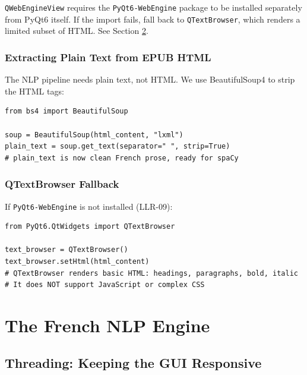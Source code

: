 \documentclass[12pt,oneside]{book}
\begin{document}
\begin{warnbox}
\texttt{QWebEngineView} requires the \texttt{PyQt6-WebEngine} package to be installed
separately from PyQt6 itself. If the import fails, fall back to \texttt{QTextBrowser},
which renders a limited subset of HTML. See Section \ref{sec:textbrowser-fallback}.
\end{warnbox}

\section{Extracting Plain Text from EPUB HTML}
\label{sec:epub-text}

The NLP pipeline needs plain text, not HTML. We use BeautifulSoup4 to strip the HTML tags:

\begin{lstlisting}[caption={Stripping HTML tags for NLP input}]
from bs4 import BeautifulSoup

soup = BeautifulSoup(html_content, "lxml")
plain_text = soup.get_text(separator=" ", strip=True)
# plain_text is now clean French prose, ready for spaCy
\end{lstlisting}

\section{QTextBrowser Fallback}
\label{sec:textbrowser-fallback}

If \texttt{PyQt6-WebEngine} is not installed (LLR-09):

\begin{lstlisting}[caption={QTextBrowser fallback for EPUB rendering}]
from PyQt6.QtWidgets import QTextBrowser

text_browser = QTextBrowser()
text_browser.setHtml(html_content)
# QTextBrowser renders basic HTML: headings, paragraphs, bold, italic
# It does NOT support JavaScript or complex CSS
\end{lstlisting}

\part{The French NLP Engine}

\chapter{Threading: Keeping the GUI Responsive}
\label{ch:threading}
\end{document}
